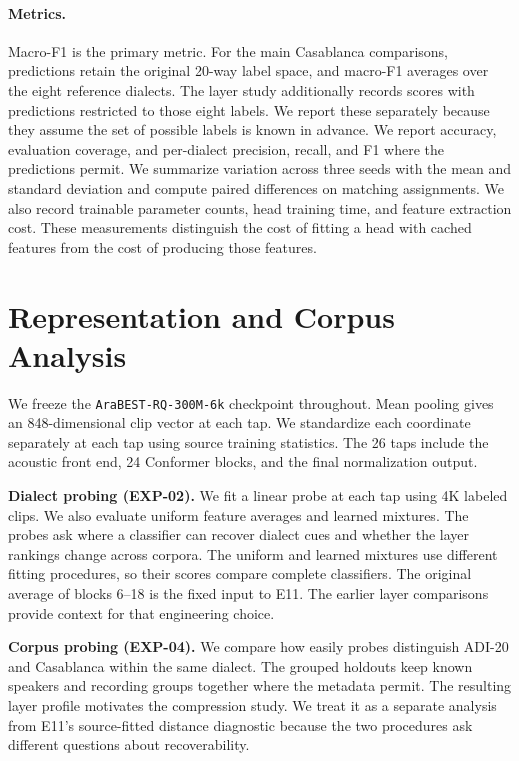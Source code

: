 \documentclass[11pt]{article}
\begin{document}
\paragraph{Metrics.}
Macro-F1 is the primary metric. For the main Casablanca comparisons, predictions retain the original 20-way label space, and macro-F1 averages over the eight reference dialects. The layer study additionally records scores with predictions restricted to those eight labels. We report these separately because they assume the set of possible labels is known in advance. We report accuracy, evaluation coverage, and per-dialect precision, recall, and F1 where the predictions permit. We summarize variation across three seeds with the mean and standard deviation and compute paired differences on matching assignments. We also record trainable parameter counts, head training time, and feature extraction cost. These measurements distinguish the cost of fitting a head with cached features from the cost of producing those features.

\section{Representation and Corpus Analysis}
We freeze the \texttt{AraBEST-RQ-300M-6k} checkpoint throughout. Mean pooling gives an 848-dimensional clip vector at each tap. We standardize each coordinate separately at each tap using source training statistics. The 26 taps include the acoustic front end, 24 Conformer blocks, and the final normalization output.

\textbf{Dialect probing (EXP-02).} We fit a linear probe at each tap using 4K labeled clips. We also evaluate uniform feature averages and learned mixtures. The probes ask where a classifier can recover dialect cues and whether the layer rankings change across corpora. The uniform and learned mixtures use different fitting procedures, so their scores compare complete classifiers. The original average of blocks 6--18 is the fixed input to E11. The earlier layer comparisons provide context for that engineering choice.

\textbf{Corpus probing (EXP-04).} We compare how easily probes distinguish ADI-20 and Casablanca within the same dialect. The grouped holdouts keep known speakers and recording groups together where the metadata permit. The resulting layer profile motivates the compression study. We treat it as a separate analysis from E11's source-fitted distance diagnostic because the two procedures ask different questions about recoverability.
\end{document}
